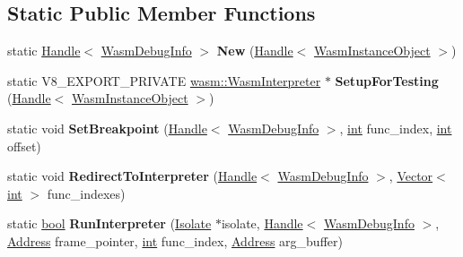 \subsection*{Static Public Member Functions}
\begin{DoxyCompactItemize}
\item 
\mbox{\label{classv8_1_1internal_1_1WasmDebugInfo_a91a45f1974f8a43a3f945c4cac8cd065}} 
static \mbox{\hyperlink{classv8_1_1internal_1_1Handle}{Handle}}$<$ \mbox{\hyperlink{classv8_1_1internal_1_1WasmDebugInfo}{Wasm\+Debug\+Info}} $>$ {\bfseries New} (\mbox{\hyperlink{classv8_1_1internal_1_1Handle}{Handle}}$<$ \mbox{\hyperlink{classv8_1_1internal_1_1WasmInstanceObject}{Wasm\+Instance\+Object}} $>$)
\item 
\mbox{\label{classv8_1_1internal_1_1WasmDebugInfo_a8f76920d83880848be54b1ea5123b63e}} 
static V8\+\_\+\+E\+X\+P\+O\+R\+T\+\_\+\+P\+R\+I\+V\+A\+TE \mbox{\hyperlink{classv8_1_1internal_1_1wasm_1_1WasmInterpreter}{wasm\+::\+Wasm\+Interpreter}} $\ast$ {\bfseries Setup\+For\+Testing} (\mbox{\hyperlink{classv8_1_1internal_1_1Handle}{Handle}}$<$ \mbox{\hyperlink{classv8_1_1internal_1_1WasmInstanceObject}{Wasm\+Instance\+Object}} $>$)
\item 
\mbox{\label{classv8_1_1internal_1_1WasmDebugInfo_a361716856a25a028d0e93643ec41d2a0}} 
static void {\bfseries Set\+Breakpoint} (\mbox{\hyperlink{classv8_1_1internal_1_1Handle}{Handle}}$<$ \mbox{\hyperlink{classv8_1_1internal_1_1WasmDebugInfo}{Wasm\+Debug\+Info}} $>$, \mbox{\hyperlink{classint}{int}} func\+\_\+index, \mbox{\hyperlink{classint}{int}} offset)
\item 
\mbox{\label{classv8_1_1internal_1_1WasmDebugInfo_a78e3426c061f712f26468c58ff4286d9}} 
static void {\bfseries Redirect\+To\+Interpreter} (\mbox{\hyperlink{classv8_1_1internal_1_1Handle}{Handle}}$<$ \mbox{\hyperlink{classv8_1_1internal_1_1WasmDebugInfo}{Wasm\+Debug\+Info}} $>$, \mbox{\hyperlink{classv8_1_1internal_1_1Vector}{Vector}}$<$ \mbox{\hyperlink{classint}{int}} $>$ func\+\_\+indexes)
\item 
\mbox{\label{classv8_1_1internal_1_1WasmDebugInfo_a152f9e1e71047feca57508a7df8a61c5}} 
static \mbox{\hyperlink{classbool}{bool}} {\bfseries Run\+Interpreter} (\mbox{\hyperlink{classv8_1_1internal_1_1Isolate}{Isolate}} $\ast$isolate, \mbox{\hyperlink{classv8_1_1internal_1_1Handle}{Handle}}$<$ \mbox{\hyperlink{classv8_1_1internal_1_1WasmDebugInfo}{Wasm\+Debug\+Info}} $>$, \mbox{\hyperlink{classuintptr__t}{Address}} frame\+\_\+pointer, \mbox{\hyperlink{classint}{int}} func\+\_\+index, \mbox{\hyperlink{classuintptr__t}{Address}} arg\+\_\+buffer)

\end{DoxyCompactItemize}
